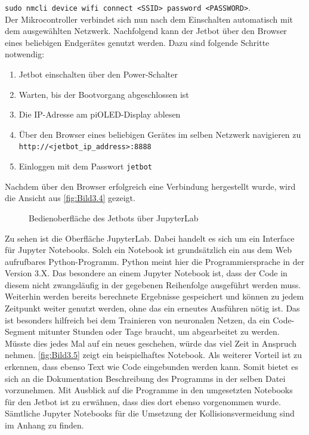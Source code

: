 \texttt{sudo nmcli device wifi connect <SSID> password <PASSWORD>}. \\

Der Mikrocontroller verbindet sich nun nach dem Einschalten automatisch mit dem ausgewählten Netzwerk. Nachfolgend kann der Jetbot über den Browser eines beliebigen Endgerätes genutzt werden. Dazu sind folgende Schritte notwendig:

\begin{enumerate}
    \item Jetbot einschalten über den Power-Schalter
    \item Warten, bis der Bootvorgang abgeschlossen ist
    \item Die IP-Adresse am piOLED-Display ablesen
    \item Über den Browser eines beliebigen Gerätes im selben Netzwerk navigieren zu \\\texttt{http://<jetbot_ip_address>:8888}
    \item Einloggen mit dem Passwort \texttt{jetbot}
\end{enumerate}

Nachdem über den Browser erfolgreich eine Verbindung hergestellt wurde, wird die Ansicht aus \autoref{fig:Bild3.4} gezeigt.

\begin{figure}[H]
    \centering
    \caption[Jetbot Bedienoberfläche]{Bedienoberfläche des Jetbots über JupyterLab}
    \label{fig:Bild3.4}
\end{figure}

Zu sehen ist die Oberfläche JupyterLab. Dabei handelt es sich um ein Interface für Jupyter Notebooks. Solch ein Notebook ist grundsätzlich ein aus dem Web aufrufbares Python-Programm. Python meint hier die Programmiersprache in der Version 3.X. Das besondere an einem Jupyter Notebook ist, dass der Code in diesem nicht zwangsläufig in der gegebenen Reihenfolge ausgeführt werden muss. Weiterhin werden bereits berechnete Ergebnisse gespeichert und können zu jedem Zeitpunkt weiter genutzt werden, ohne das ein erneutes Ausführen nötig ist. Das ist besonders hilfreich bei dem Trainieren von neuronalen Netzen, da ein Code-Segment mitunter Stunden oder Tage braucht, um abgearbeitet zu werden. Müsste dies jedes Mal auf ein neues geschehen, würde das viel Zeit in Anspruch nehmen. \autoref{fig:Bild3.5} zeigt ein beispielhaftes Notebook. Als weiterer Vorteil ist zu erkennen, dass ebenso Text wie Code eingebunden werden kann. Somit bietet es sich an die Dokumentation \bzw Beschreibung des Programms in der selben Datei vorzunehmen. Mit Ausblick auf die Programme in den umgesetzten Notebooks für den Jetbot ist zu erwähnen, dass dies dort ebenso vorgenommen wurde. Sämtliche Jupyter Notebooks für die Umsetzung der Kollisionsvermeidung sind im Anhang zu finden.


